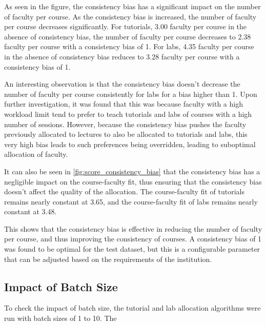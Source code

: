As seen in the figure, the consistency bias has a significant impact on the number of faculty per course. As the consistency bias is increased, the number of faculty per course decreases significantly. For tutorials, 3.00 faculty per course in the absence of consistency bias, the number of faculty per course decreases to 2.38 faculty per course with a consistency bias of 1. For labs, 4.35 faculty per course in the absence of consistency bias reduces to 3.28 faculty per course with a consistency bias of 1.

An interesting observation is that the consistency bias doesn't decrease the number of faculty per course consistently for labs for a bias higher than 1. Upon further investigation, it was found that this was because faculty with a high workload limit tend to prefer to teach tutorials and labs of courses with a high number of sessions. However, because the consistency bias pushes the faculty previously allocated to lectures to also be allocated to tutorials and labs, this very high bias leads to such preferences being overridden, leading to suboptimal allocation of faculty.

It can also be seen in \autoref{fig:score_consistency_bias} that the consistency bias has a negligible impact on the course-faculty fit, thus ensuring that the consistency bias doesn't affect the quality of the allocation. The course-faculty fit of tutorials remains nearly constant at 3.65, and the course-faculty fit of labs remains nearly constant at 3.48.

This shows that the consistency bias is effective in reducing the number of faculty per course, and thus improving the consistency of courses. A consistency bias of 1 was found to be optimal for the test dataset, but this is a configurable parameter that can be adjusted based on the requirements of the institution.

\subsection{Impact of Batch Size}

To check the impact of batch size, the tutorial and lab allocation algorithms were run with batch sizes of 1 to 10. The

